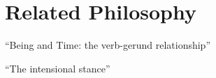 \chapter{Related Philosophy}

``Being and Time: the verb-gerund relationship''

``The intensional stance''

